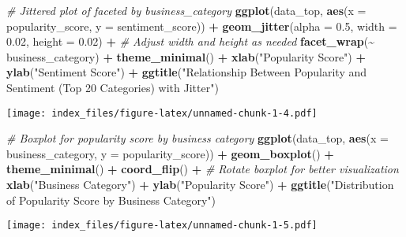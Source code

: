 \documentclass[
]{article}
\newenvironment{Shaded}{\begin{snugshade}}{\end{snugshade}}
\newcommand{\AttributeTok}[1]{\textcolor[rgb]{0.13,0.29,0.53}{#1}}
\newcommand{\CommentTok}[1]{\textcolor[rgb]{0.56,0.35,0.01}{\textit{#1}}}
\newcommand{\FloatTok}[1]{\textcolor[rgb]{0.00,0.00,0.81}{#1}}
\newcommand{\FunctionTok}[1]{\textcolor[rgb]{0.13,0.29,0.53}{\textbf{#1}}}
\newcommand{\NormalTok}[1]{#1}
\newcommand{\SpecialCharTok}[1]{\textcolor[rgb]{0.81,0.36,0.00}{\textbf{#1}}}
\newcommand{\StringTok}[1]{\textcolor[rgb]{0.31,0.60,0.02}{#1}}
\begin{document}
\begin{Shaded}
\begin{Highlighting}[]
\CommentTok{\# Jittered plot of faceted by business\_category}
\FunctionTok{ggplot}\NormalTok{(data\_top, }\FunctionTok{aes}\NormalTok{(}\AttributeTok{x =}\NormalTok{ popularity\_score, }\AttributeTok{y =}\NormalTok{ sentiment\_score)) }\SpecialCharTok{+}
  \FunctionTok{geom\_jitter}\NormalTok{(}\AttributeTok{alpha =} \FloatTok{0.5}\NormalTok{, }\AttributeTok{width =} \FloatTok{0.02}\NormalTok{, }\AttributeTok{height =} \FloatTok{0.02}\NormalTok{) }\SpecialCharTok{+}  \CommentTok{\# Adjust \textquotesingle{}width\textquotesingle{} and \textquotesingle{}height\textquotesingle{} as needed}
  \FunctionTok{facet\_wrap}\NormalTok{(}\SpecialCharTok{\textasciitilde{}}\NormalTok{ business\_category) }\SpecialCharTok{+}
  \FunctionTok{theme\_minimal}\NormalTok{() }\SpecialCharTok{+}
  \FunctionTok{xlab}\NormalTok{(}\StringTok{"Popularity Score"}\NormalTok{) }\SpecialCharTok{+}
  \FunctionTok{ylab}\NormalTok{(}\StringTok{"Sentiment Score"}\NormalTok{) }\SpecialCharTok{+}
  \FunctionTok{ggtitle}\NormalTok{(}\StringTok{"Relationship Between Popularity and Sentiment (Top 20 Categories) with Jitter"}\NormalTok{)}
\end{Highlighting}
\end{Shaded}

\texttt{[image: index\_files/figure-latex/unnamed-chunk-1-4.pdf]}

\begin{Shaded}
\begin{Highlighting}[]
\CommentTok{\# Boxplot for popularity score by business category}
\FunctionTok{ggplot}\NormalTok{(data\_top, }\FunctionTok{aes}\NormalTok{(}\AttributeTok{x =}\NormalTok{ business\_category, }\AttributeTok{y =}\NormalTok{ popularity\_score)) }\SpecialCharTok{+}
  \FunctionTok{geom\_boxplot}\NormalTok{() }\SpecialCharTok{+}
  \FunctionTok{theme\_minimal}\NormalTok{() }\SpecialCharTok{+}
  \FunctionTok{coord\_flip}\NormalTok{() }\SpecialCharTok{+}  \CommentTok{\# Rotate boxplot for better visualization}
  \FunctionTok{xlab}\NormalTok{(}\StringTok{"Business Category"}\NormalTok{) }\SpecialCharTok{+}
  \FunctionTok{ylab}\NormalTok{(}\StringTok{"Popularity Score"}\NormalTok{) }\SpecialCharTok{+}
  \FunctionTok{ggtitle}\NormalTok{(}\StringTok{"Distribution of Popularity Score by Business Category"}\NormalTok{)}
\end{Highlighting}
\end{Shaded}

\texttt{[image: index\_files/figure-latex/unnamed-chunk-1-5.pdf]}
\end{document}
